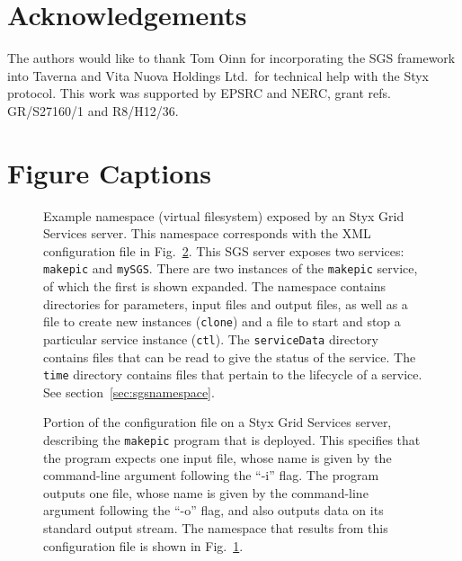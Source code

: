 \documentclass[a4paper]{article}
\begin{document}
\section*{Acknowledgements}
The authors would like to thank Tom Oinn for incorporating the SGS framework into Taverna and Vita Nuova Holdings Ltd.\ for technical help with the Styx protocol.  This work was supported by EPSRC and NERC, grant refs. GR/S27160/1 and R8/H12/36.

%
%




\newpage
\singlespace

\section*{Figure Captions}

\begin{figure}[h]
\caption{Example namespace (virtual filesystem) exposed by an Styx Grid Services server.  This namespace corresponds with the XML configuration file in Fig.~\ref{fig:makepicconfig}.  This SGS server exposes two services: \texttt{makepic} and \texttt{mySGS}.  There are two instances of the \texttt{makepic} service, of which the first is shown expanded.  The namespace contains directories for parameters, input files and output files, as well as a file to create new instances (\texttt{clone}) and a file to start and stop a particular service instance (\texttt{ctl}).  The \texttt{serviceData} directory contains files that can be read to give the status of the service.  The \texttt{time} directory contains files that pertain to the lifecycle of a service.  See section~\ref{sec:sgsnamespace}.}\label{fig:sgsnamespace}
\end{figure}

\begin{figure}[h]
\caption{Portion of the configuration file on a Styx Grid Services server, describing the \texttt{makepic} program that is deployed.  This specifies that the program expects one input file, whose name is given by the command-line argument following the ``-i'' flag.  The program outputs one file, whose name is given by the command-line argument following the ``-o'' flag, and also outputs data on its standard output stream.  The namespace that results from this configuration file is shown in Fig.~\ref{fig:sgsnamespace}.}
\label{fig:makepicconfig}
\end{figure}
\end{document}
